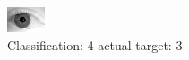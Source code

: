 \begin{figure}[h!]
\begin{center}
\includegraphics[width=0.60\columnwidth]{figures/ID2117_class_4_target_3.png}
\end{center}
\caption{ Classification: 4 actual target: 3}
\label{fig:ID2117_class_4_target_3}
\end{figure}
